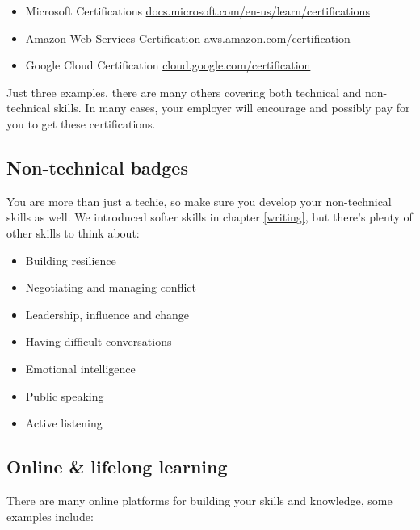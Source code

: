 \documentclass[
]{book}
\providecommand{\tightlist}{%
  \setlength{\itemsep}{0pt}\setlength{\parskip}{0pt}}
\begin{document}
\begin{itemize}
\tightlist
\item
  Microsoft Certifications \href{https://docs.microsoft.com/en-us/learn/certifications/}{docs.microsoft.com/en-us/learn/certifications}
\item
  Amazon Web Services Certification \href{https://aws.amazon.com/certification/}{aws.amazon.com/certification}
\item
  Google Cloud Certification \href{https://cloud.google.com/certification}{cloud.google.com/certification}
\end{itemize}

Just three examples, there are many others covering both technical and non-technical skills. In many cases, your employer will encourage and possibly pay for you to get these certifications.

\hypertarget{techieplusplus}{%
\subsection{Non-technical badges}\label{techieplusplus}}

You are more than just a techie, so make sure you develop your non-technical skills as well. We introduced softer skills in chapter \ref{writing}, but there's plenty of other skills to think about:

\begin{itemize}
\tightlist
\item
  Building resilience
\item
  Negotiating and managing conflict
\item
  Leadership, influence and change
\item
  Having difficult conversations
\item
  Emotional intelligence
\item
  Public speaking
\item
  Active listening
\end{itemize}

\hypertarget{mooc}{%
\subsection{Online \& lifelong learning}\label{mooc}}

There are many online platforms for building your skills and knowledge, some examples include:
\end{document}
